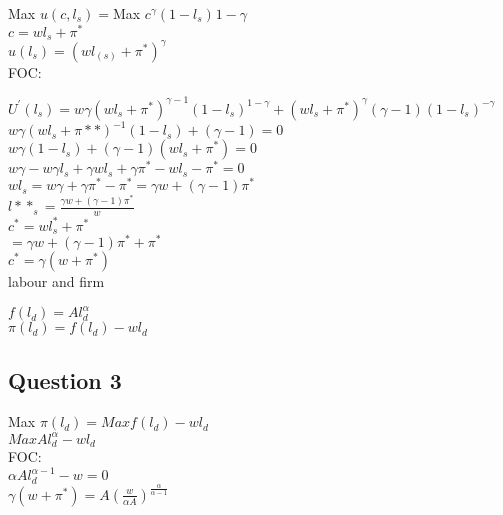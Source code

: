 \documentclass[11pt]{article}
\begin{document}
Max $u(c,l_{s})= $Max  $c^{\gamma}(1-l_{s})^{}1-\gamma$\\

$c=wl_{s}+\pi^{*}$\\

$u(l_{s})=(wl_(s)+\pi^{*})^{\gamma}$\\


FOC:

$U^{\prime}(l_{s})=w\gamma(wl_{s}+\pi^{*})^{\gamma-1}(1-l_{s})^{1-\gamma}+(wl_{s}+\pi^{*})^{\gamma}(\gamma-1)(1-l_{s})^{-\gamma}$\\

$w\gamma(wl_{s}+\pi*{*})^{-1}(1-l_{s})+(\gamma-1)=0$\\

$w\gamma(1-l_{s})+(\gamma-1)(wl_{s}+\pi^{*})=0$\\

$w\gamma-w\gamma l_{s}+\gamma w l_{s}+\gamma \pi^{*}-w l_{s}-\pi^{*}=0$\\

$wl_{s}=w\gamma+\gamma\pi^{*}-\pi^{*}=\gamma w +(\gamma-1)\pi^{*}$\\

$l*{*}_{s}=\frac{\gamma w +(\gamma-1)\pi^{*}}{w}$\\

$c^{*}=wl_{s}^{*}+\pi^{*}$\\

$=\gamma w+(\gamma-1)\pi^{*}+\pi^{*}$\\

$c^{*}=\gamma(w+\pi^{*})$\\


labour and firm

$f(l_{d})=Al_{d}^{\alpha}$\\

$\pi(l_{d})=f(l_{d})-wl_{d}$


\subsection{Question 3}

Max $\pi(l_{d})= Max f(l_{d})-wl_{d}$\\

$Max Al_{d}^{\alpha}-wl_{d}$\\

FOC:\\
$\alpha Al_{d}^{\alpha-1}-w=0$\\


$\gamma(w+\pi^{*})=A\left(  \frac{w}{\alpha A} \right)^{\frac{\alpha}{\alpha-1}}$\\
\end{document}
